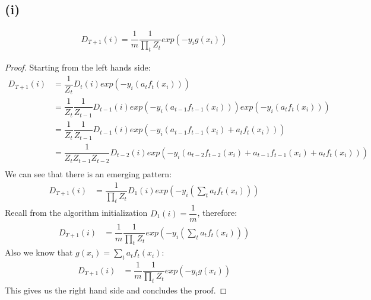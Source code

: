 \documentclass[]{homework}
\begin{document}
\subsection*{(i)}
\begin{align}
    D_{T+1}(i)= \dfrac{1}{m}\dfrac{1}{\prod_t Z_t}exp(-y_ig(x_i))
\end{align}
\begin{proof}
Starting from the left hands side:
\begin{align*}
    D_{T+1}(i) &= \dfrac{1}{Z_t}D_{t}(i)exp(-y_i(a_{t}f_{t}(x_i)))\\
               &= \dfrac{1}{Z_t}\dfrac{1}{Z_{t-1}}D_{t-1}(i)exp(-y_i(a_{t-1}f_{t-1}(x_i)))exp(-y_i(a_{t}f_{t}(x_i)))\\
               &= \dfrac{1}{Z_t}\dfrac{1}{Z_{t-1}}D_{t-1}(i)exp(-y_i(a_{t-1}f_{t-1}(x_i)+a_{t}f_{t}(x_i)))\\
               &= \dfrac{1}{Z_tZ_{t-1}Z_{t-2}}D_{t-2}(i)exp(-y_i(a_{t-2}f_{t-2}(x_i)+a_{t-1}f_{t-1}(x_i)+a_{t}f_{t}(x_i)))\\
\end{align*}
We can see that there is an emerging pattern: 
\begin{align*}
        D_{T+1}(i) &= \dfrac{1}{\prod_t Z_t}D_{1}(i)exp(-y_i(\sum_t a_tf_t(x_i)))
\end{align*}
Recall from the algorithm initialization $D_1(i) = \dfrac{1}{m}$, therefore:
\begin{align*}
        D_{T+1}(i) &= \dfrac{1}{m}\dfrac{1}{\prod_t Z_t}exp(-y_i(\sum_t a_tf_t(x_i)))
\end{align*}
Also we know that $g(x_i) = \sum_t a_t f_t(x_i)$: 
\begin{align*}
        D_{T+1}(i)  &= \dfrac{1}{m}\dfrac{1}{\prod_t Z_t}exp(-y_i g(x_i))
\end{align*}
This gives us the right hand side and concludes the proof. 
\end{proof}

\newpage
\end{document}

